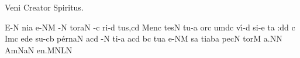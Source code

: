 \beginhymn Veni Creator Spiritus.

\nosolesmescustos
{}
\Internote
\initiumgregorianum
{}%
\sgn {}E-\punctum N\egn
\sgn ni{}\punctum a\egn
\spatium
{}e-\clivis NM\egn
{}-\punctum N\egn
\sgn tor\clivis aN\egn
\spatium
{}-\punctum c\egn
\sgn ri-\punctum d\egn
\sgn tu{s,}\punctum c\augmentum d\egn
\spatium
\divisiominor
\spatium
\sgn Men\punctum c\egn
\sgn tes\punctum N\egn
\spatium
\sgn tu-\punctum a\egn
\sgn {}or\punctum c\egn
\sgn {}um\clivis dc\egn
\spatium
\sgn v{\'\i}-\punctum d\egn
\sgn si-\punctum e\egn
\sgn ta{ :}\punctum d\augmentum d\egn
\spatium
\divisiomaior
\custos c
\lineaproxima
\sgn {}Im\punctum c\egn
{}e{}\pes de\egn
\spatium
\sgn su-\clivis cb\egn
\sgn p{\'e}{rn}\clivis aN\egn
\sgn {}a{}\pes cd\egn
\spatium
{}-\punctum N\egn
\sgn ti-\punctum a\egn
\sgn {}a{}\punctum c\augmentum d\egn
\spatium
\divisiominor
\spatium
{}\pes bc\egn
\spatium
\sgn tu{}\punctum a\egn
\spatium
{}e-\clivis NM\egn
{}s\punctum a\egn
\sgn ti{}\torculus aba\egn
\spatium
\sgn pec\punctum N\egn
\sgn tor\punctum M\egn
\sgn {}a.\punctum N\augmentum N\egn
\spatium
\divisiofinalis
\spatium
\sgn {}Am\torculus NaN\egn
\sgn {}e{n.}\pes MN\augmentumduplex LN\egn
\Finisgregoriana

\bigskip


\beginlyrics

